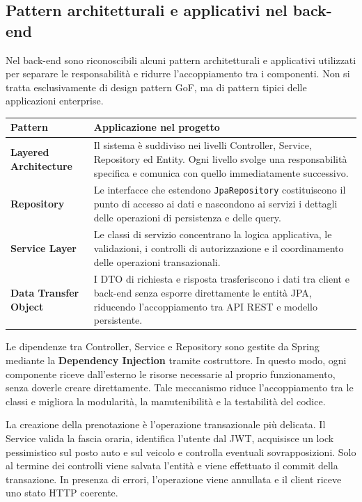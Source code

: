 \documentclass[11pt,a4paper]{article}
\begin{document}
\subsection{Pattern architetturali e applicativi nel back-end}

Nel back-end sono riconoscibili alcuni pattern architetturali e applicativi utilizzati per separare le responsabilità e ridurre l'accoppiamento tra i componenti. Non si tratta esclusivamente di design pattern GoF, ma di pattern tipici delle applicazioni enterprise.

\begin{table}[H]
\centering
\footnotesize
\begin{tabularx}{\textwidth}{>{\raggedright\arraybackslash\bfseries}p{3.65cm}Y}
\toprule
Pattern & Applicazione nel progetto \\
\midrule
Layered Architecture & Il sistema è suddiviso nei livelli Controller, Service, Repository ed Entity. Ogni livello svolge una responsabilità specifica e comunica con quello immediatamente successivo. \\
Repository & Le interfacce che estendono \texttt{JpaRepository} costituiscono il punto di accesso ai dati e nascondono ai servizi i dettagli delle operazioni di persistenza e delle query. \\
Service Layer & Le classi di servizio concentrano la logica applicativa, le validazioni, i controlli di autorizzazione e il coordinamento delle operazioni transazionali. \\
Data Transfer Object & I DTO di richiesta e risposta trasferiscono i dati tra client e back-end senza esporre direttamente le entità JPA, riducendo l'accoppiamento tra API REST e modello persistente. \\
\bottomrule
\end{tabularx}
\end{table}

Le dipendenze tra Controller, Service e Repository sono gestite da Spring mediante la \textbf{Dependency Injection} tramite costruttore. In questo modo, ogni componente riceve dall’esterno le risorse necessarie al proprio funzionamento, senza doverle creare direttamente. Tale meccanismo riduce l’accoppiamento tra le classi e migliora la modularità, la manutenibilità e la testabilità del codice.

La creazione della prenotazione è l'operazione transazionale più delicata. Il Service valida la fascia oraria, identifica l'utente dal JWT, acquisisce un lock pessimistico sul posto auto e sul veicolo e controlla eventuali sovrapposizioni. Solo al termine dei controlli viene salvata l'entità e viene effettuato il commit della transazione. In presenza di errori, l'operazione viene annullata e il client riceve uno stato HTTP coerente.
\end{document}
